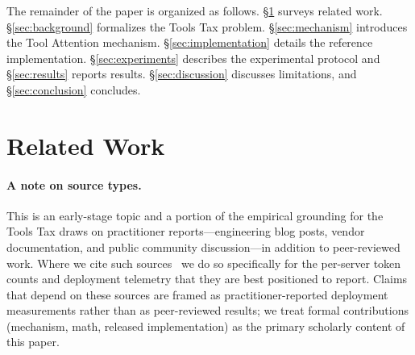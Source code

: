 \documentclass[11pt]{article}
\begin{document}
The remainder of the paper is organized as follows. \S\ref{sec:related} surveys related work. \S\ref{sec:background} formalizes the Tools Tax problem. \S\ref{sec:mechanism} introduces the Tool Attention mechanism. \S\ref{sec:implementation} details the reference implementation. \S\ref{sec:experiments} describes the experimental protocol and \S\ref{sec:results} reports results. \S\ref{sec:discussion} discusses limitations, and \S\ref{sec:conclusion} concludes.

\section{Related Work}\label{sec:related}

\paragraph{A note on source types.} This is an early-stage topic and a portion of the empirical grounding for the Tools Tax draws on practitioner reports---engineering blog posts, vendor documentation, and public community discussion---in addition to peer-reviewed work. Where we cite such sources~\citep{pan2026agent,kloski2026mcp,mindstudio2026claudecode,saha2026agentic} we do so specifically for the per-server token counts and deployment telemetry that they are best positioned to report. Claims that depend on these sources are framed as practitioner-reported deployment measurements rather than as peer-reviewed results; we treat formal contributions (mechanism, math, released implementation) as the primary scholarly content of this paper.
\end{document}
